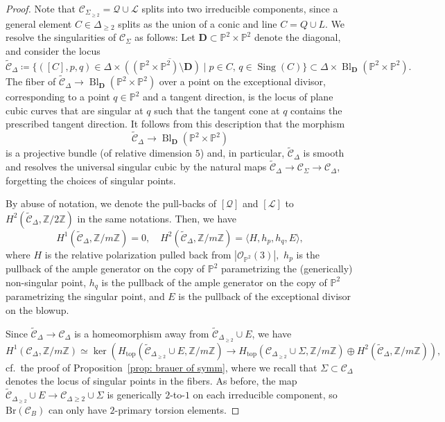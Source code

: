 \documentclass[10pt,a4paper]{amsart}
\DeclareMathOperator{\Bl}{Bl}
\DeclareMathOperator{\Sing}{Sing}
\begin{document}
\begin{proof}

Note that ${\mathcal C}_{\Sigma_{\geq 2}} = \mathcal Q \cup \mathcal L$ splits into two irreducible components, since a general element $C \in \Delta_{\geq 2}$ splits as the union of a conic and line $C = Q \cup L$. We resolve the singularities of $\mathcal{C}_\Sigma$ as follows: Let $\mathbf{D} \subset \mathbb P^2 \times \mathbb P^2$ denote the diagonal, and consider the locus
$$\widetilde{\mathcal C}_{\Delta} \coloneq\overline{\{([C], p, q) \in \Delta \times ((\mathbb P^2 \times \mathbb P^2) \setminus \mathbf D) \mid p \in C,\, q \in \Sing(C)\}} \subset \Delta \times \Bl_{\mathbf{D}}(\mathbb P^2 \times \mathbb P^2).$$
The fiber of $\widetilde{\mathcal C}_\Delta \to \Bl_{\mathbf{D}}(\mathbb P^2 \times \mathbb P^2)$ over a point on the exceptional divisor, corresponding to a point $q \in \mathbb P^2$ and a tangent direction, is the locus of plane cubic curves that are singular at $q$ such that the tangent cone at $q$ contains the prescribed tangent direction. It follows from this description that the morphism
$$\widetilde{\mathcal C}_\Delta \to \Bl_{\mathbf D}(\mathbb P^2 \times \mathbb P^2)$$
is a projective bundle (of relative dimension $5$) and, in particular, $\widetilde{\mathcal C}_\Delta$ is smooth and resolves the universal singular cubic by the natural maps $\widetilde{\mathcal C}_{\Delta} \to \mathcal{C}_\Sigma \to \mathcal{C}_\Delta$, forgetting the choices of singular points.

By abuse of notation, we denote the pull-backs of $[\mathcal{Q}]$ and $[\mathcal{L}]$ to $H^2(\widetilde{\mathcal{C}}_\Delta, \mathbb Z/ 2\mathbb Z)$ in the same notations. Then, we have 
\[
H^1(\widetilde{\mathcal C}_{\Delta}, \mathbb Z / m \mathbb Z) = 0,\quad  H^2(\widetilde{\mathcal C}_\Delta, \mathbb Z / m \mathbb Z) = \langle H, h_p, h_q, E \rangle,
\]
where $H$ is the relative polarization pulled back from $|\mathcal O_{\mathbb P^2}(3)|,$ $h_p$ is the pullback of the ample generator on the copy of $\mathbb P^2$ parametrizing the (generically) non-singular point, $h_q$ is the pullback of the ample generator on the copy of $\mathbb P^2$ parametrizing the singular point, and $E$ is the pullback of the exceptional divisor on the blowup.

Since $\widetilde{\mathcal C}_{\Delta} \to \mathcal C_\Delta$ is a homeomorphism away from $\widetilde{\mathcal C}_{\Delta_{\geq 2}} \cup E$, we have
$$H^1(\mathcal C_{\Delta}, \mathbb Z / m \mathbb Z) \simeq \ker(H_{\mathrm{top}}(\widetilde{\mathcal C}_{\Delta_{\geq 2}} \cup E, \mathbb Z / m \mathbb Z) \to H_{\mathrm{top}}(\mathcal C_{\Delta_{\geq 2}} \cup \Sigma, \mathbb Z / m \mathbb Z) \oplus H^2(\widetilde{\mathcal C}_{\Delta}, \mathbb Z / m \mathbb Z)),$$
cf.\ the proof of Proposition~\ref{prop: brauer of symm},
where we recall that $\Sigma \subset \mathcal C_{\Delta}$ denotes the locus of singular points in the fibers. As before, the map $\widetilde{\mathcal{C}}_{\Delta_{\geq 2}} \cup E \to \mathcal{C}_{\Delta \geq 2} \cup \Sigma$ is generically $2$-to-$1$ on each irreducible component, so $\mathrm{Br}(\mathcal{C}_B)$ can only have $2$-primary torsion elements.


\end{proof}
\end{document}
